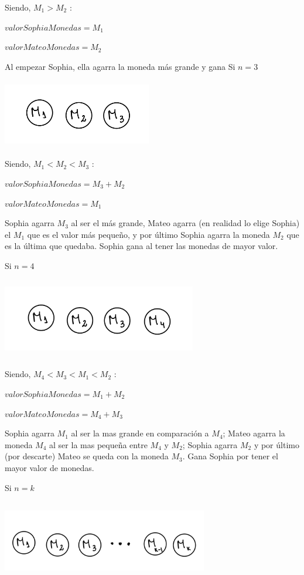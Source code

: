Siendo, $M_{1}>M_{2}$ : 


$valorSophiaMonedas=M_{1}$

$valorMateoMonedas=M_{2}$

Al empezar Sophia, ella agarra la moneda más grande y gana
\vskip1cm
Si $n=3$

\includegraphics[width=6.5cm, height=3cm]{images/IMG_1627.jpg}

Siendo, $M_{1}<M_{2}<M_{3}$ : 


$valorSophiaMonedas=M_{3}+M_{2}$

$valorMateoMonedas=M_{1}$

Sophia agarra $M_{3}$ al ser el más grande, Mateo agarra (en realidad lo elige Sophia) el $M_{1}$ que es el valor
más pequeño, y por último Sophia agarra la moneda $M_{2}$ que es la última que quedaba. 
Sophia gana al tener las monedas de mayor valor.

\vskip1cm
Si $n=4$

\includegraphics[width=8.5cm, height=3.5cm]{images/IMG_1628.jpg}

Siendo, $M_{4}<M_{3}<M_{1}<M_{2}$ : 

$valorSophiaMonedas=M_{1}+M_{2}$

$valorMateoMonedas=M_{4}+M_{3}$

Sophia agarra $M_{1}$ al ser la mas grande en comparación a $M_{4}$; Mateo agarra la moneda $M_{4}$ al ser la mas 
pequeña entre $M_{4}$ y $M_{2}$; Sophia agarra $M_{2}$ y por último (por descarte) Mateo se queda con la moneda $M_{3}$.
Gana Sophia por tener el mayor valor de monedas.

\vskip1cm
Si $n=k$

\includegraphics[width=9cm, height=3.5cm]{images/IMG_1629.jpg}

